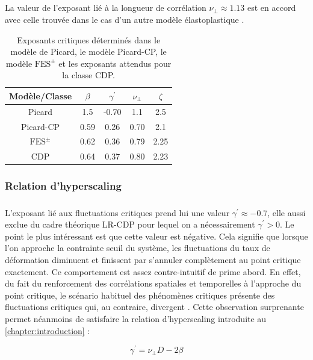 \subparagraph{}La valeur de l'exposant lié à la longueur de corrélation $\nu_\perp \approx 1.13$ est en accord avec celle trouvée dans le cas d'un autre modèle élastoplastique \cite{lin_scaling_2014}.

\begin{table}
\centering
\begin{tabular}{ccccc}
\hline \hline Modèle/Classe & $\beta$ & \multicolumn{1}{c}{$\gamma^{\prime}$} & $\nu_{\perp}$ & $\zeta$ \\
\hline Picard & 1.5 & -0.70 & 1.1 & 2.5 \\
Picard-CP & 0.59 & 0.26 & 0.70 & 2.1 \\
$\text{FES}^\pm$ & 0.62 & 0.36 & 0.79 & 2.25 \\
CDP \cite{lubeck_universal_2004} & 0.64 & 0.37 & 0.80 & 2.23 \\
\hline \hline
\end{tabular}
\caption{Exposants critiques déterminés dans le modèle de Picard, le modèle Picard-CP, le modèle $\text{FES}^\pm$ et les exposants attendus pour la classe CDP.}
\label{tab:expocrit}
\end{table}

\subsubsection{Relation d'hyperscaling}

\subparagraph{}L'exposant lié aux fluctuations critiques prend lui une valeur $\gamma^\prime \approx -0.7$, elle aussi exclue du cadre théorique LR-CDP pour lequel on a nécessairement $\gamma^\prime>0$. Le point le plus intéressant est que cette valeur est négative. Cela signifie que lorsque l'on approche la contrainte seuil du système, les fluctuations du taux de déformation diminuent et finissent par s'annuler complètement au point critique exactement. Ce comportement est assez contre-intuitif de prime abord. En effet, du fait du renforcement des corrélations spatiales et temporelles à l'approche du point critique, le scénario habituel des phénomènes critiques présente des fluctuations critiques qui, au contraire, divergent \cite{kardar_statistical_2007}. Cette observation surprenante permet néanmoins de satisfaire la relation d'hyperscaling introduite au \autoref{chapter:introduction} :

\begin{equation}
	\gamma^\prime = \nu_\perp D - 2\beta
	\label{eq:hyperscalingEPM}
\end{equation}

